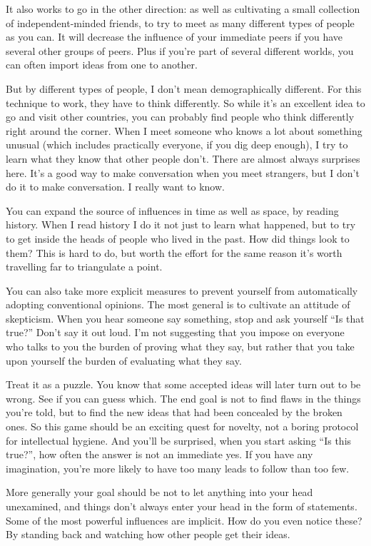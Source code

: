 It also works to go in the other direction: as well as cultivating a
small collection of independent-minded friends, to try to meet as many
different types of people as you can. It will decrease the influence of
your immediate peers if you have several other groups of peers. Plus if
you're part of several different worlds, you can often import ideas from
one to another.

But by different types of people, I don't mean demographically
different. For this technique to work, they have to think differently.
So while it's an excellent idea to go and visit other countries, you can
probably find people who think differently right around the corner. When
I meet someone who knows a lot about something unusual (which includes
practically everyone, if you dig deep enough), I try to learn what they
know that other people don't. There are almost always surprises here.
It's a good way to make conversation when you meet strangers, but I
don't do it to make conversation. I really want to know.

You can expand the source of influences in time as well as space, by
reading history. When I read history I do it not just to learn what
happened, but to try to get inside the heads of people who lived in the
past. How did things look to them? This is hard to do, but worth the
effort for the same reason it's worth travelling far to triangulate a
point.

You can also take more explicit measures to prevent yourself from
automatically adopting conventional opinions. The most general is to
cultivate an attitude of skepticism. When you hear someone say
something, stop and ask yourself ``Is that true?'' Don't say it out
loud. I'm not suggesting that you impose on everyone who talks to you
the burden of proving what they say, but rather that you take upon
yourself the burden of evaluating what they say.

Treat it as a puzzle. You know that some accepted ideas will later turn
out to be wrong. See if you can guess which. The end goal is not to find
flaws in the things you're told, but to find the new ideas that had been
concealed by the broken ones. So this game should be an exciting quest
for novelty, not a boring protocol for intellectual hygiene. And you'll
be surprised, when you start asking ``Is this true?'', how often the
answer is not an immediate yes. If you have any imagination, you're more
likely to have too many leads to follow than too few.

More generally your goal should be not to let anything into your head
unexamined, and things don't always enter your head in the form of
statements. Some of the most powerful influences are implicit. How do
you even notice these? By standing back and watching how other people
get their ideas.

